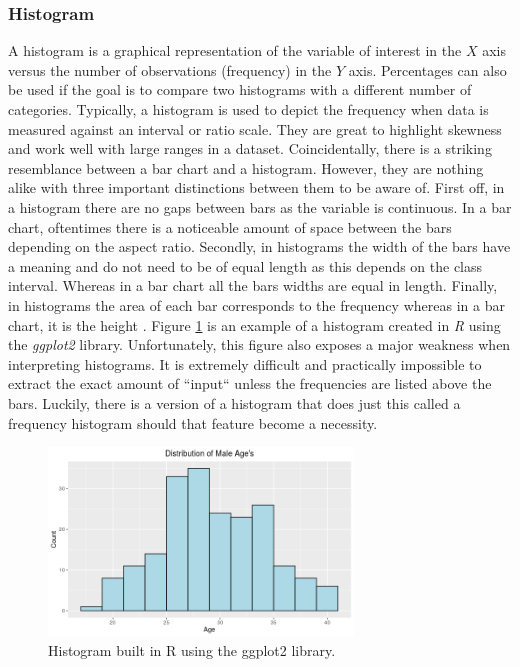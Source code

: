 \subsubsection{Histogram}
A histogram is a graphical representation of the variable of interest in the 
$X$ axis versus the number of observations (frequency) in the $Y$ axis. Percentages 
can also be used if the goal is to compare two histograms with a different number of 
categories. Typically, a histogram is used to depict the frequency when data is 
measured against an interval or ratio scale. They are great to highlight skewness
and work well with large ranges in a dataset. Coincidentally, there is a striking
resemblance between a bar chart and a histogram. However, they are nothing alike 
with three important distinctions between them to be aware of. First off, in a histogram there 
are no gaps between bars as the variable is continuous. In a bar chart, oftentimes 
there is a noticeable amount of space between the bars depending on the aspect
ratio. Secondly, in histograms the width of the bars have a meaning and do not 
need to be of equal length as this depends on the class interval. Whereas in a bar 
chart all the bars widths are equal in length. Finally, in histograms the area 
of each bar corresponds to the frequency whereas in a bar chart, it is the height \cite{c10}. 
Figure \ref{figure:histogram} is an example of a histogram created in \textit{R} 
using the \textit{ggplot2} library. Unfortunately, this figure also exposes a major 
weakness when interpreting histograms. It is extremely difficult and practically 
impossible to extract the exact amount of ``input`` unless the frequencies are listed 
above the bars. Luckily, there is a version of a histogram that does just this 
called a frequency histogram should that feature become a necessity. 

\begin{figure}[!ht]
    \centering
        \includegraphics[height=5cm]{figures/histogram.png}
    \caption{Histogram built in R using the ggplot2 library.}
    \label{figure:histogram}
\end{figure} 

